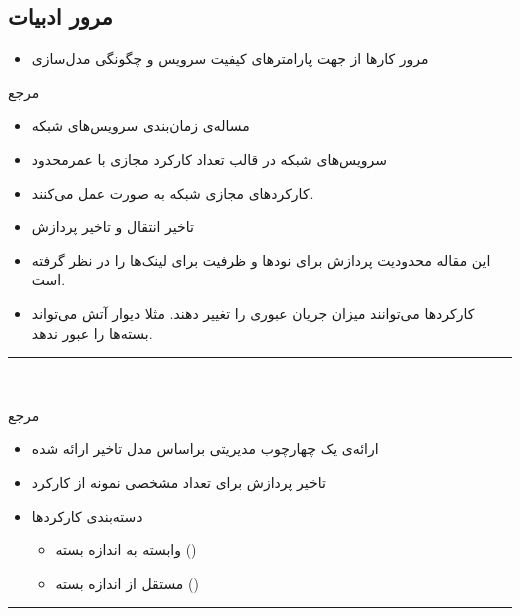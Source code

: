 \documentclass[dvipsnames]{beamer}
\makeatletter
\newcommand{\RTList}{\raggedleft\rightskip\@totalleftmargin}
\makeatother
\begin{document}
\begin{persian}
	\section{مرور ادبیات}

	\begin{frame}{}
	  \begin{itemize}
			  \item مرور کارها از جهت پارامترهای کیفیت سرویس و چگونگی مدل‌سازی
	  \end{itemize}
	\end{frame}


	\begin{frame}{مرجع~\cite{Qu2016}}
		\begin{itemize}\RTList{}
			\justifying%
			\item مساله‌ی زمان‌بندی سرویس‌های شبکه
			\item سرویس‌های شبکه در قالب تعداد کارکرد مجازی با عمرمحدود
			\item کارکردهای مجازی شبکه به صورت  عمل می‌کنند.
			\item تاخیر انتقال و تاخیر پردازش
			\item این مقاله محدودیت پردازش برای نودها و ظرفیت برای لینک‌ها را در نظر گرفته است.
			\item کارکردها می‌توانند میزان جریان عبوری را تغییر دهند. مثلا دیوار آتش می‌تواند بسته‌ها را عبور ندهد.
		\end{itemize}
		\begin{latin}
		\noindent\rule{1cm}{0.4pt}\\
		\scriptsize{}
		\end{latin}
	\end{frame}

	\begin{frame}{مرجع~\cite{Li2017}}
		\begin{itemize}\RTList{}
				\justifying%
				\item ارائه‌ی یک چهارچوب مدیریتی براساس مدل تاخیر ارائه شده
				\item تاخیر پردازش برای تعداد مشخصی نمونه از کارکرد
				\item دسته‌بندی کارکردها
				\begin{itemize}\RTList{}
						\item وابسته به اندازه بسته ()
						\item مستقل از اندازه بسته ()
				\end{itemize}
		\end{itemize}
		\begin{latin}
		\noindent\rule{1cm}{0.4pt}\\
		\scriptsize{}
		\end{latin}
	\end{frame}


\end{persian}
\end{document}
